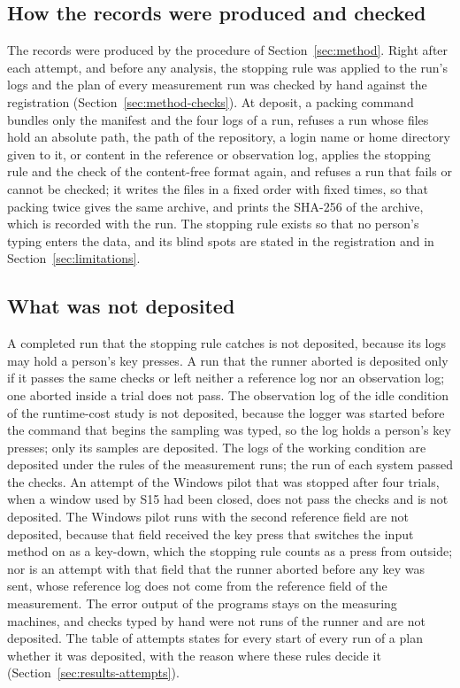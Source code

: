 \subsection{How the records were produced and checked}
\label{sec:dataset-checks}

The records were produced by the procedure of Section~\ref{sec:method}. Right after each attempt, and before any
analysis, the stopping rule was applied to the run's logs and the plan of every measurement run was checked by hand
against the registration (Section~\ref{sec:method-checks}). At deposit, a packing command bundles only the manifest and
the four logs of a run, refuses a run whose files hold an absolute path, the path of the repository, a login name or home
directory given to it, or content in the reference or observation log, applies the stopping rule and the check of the content-free
format again, and refuses a run that fails or cannot be checked; it writes the files in a fixed order with fixed times,
so that packing twice gives the same archive, and prints the SHA-256 of the archive, which is recorded with the run.
The stopping rule exists so that no person's typing enters the data, and its blind spots are stated in the
registration and in Section~\ref{sec:limitations}.

\subsection{What was not deposited}
\label{sec:dataset-excluded}

A completed run that the stopping rule catches is not deposited, because its logs may hold a person's key presses. A
run that the runner aborted is deposited only if it passes the same checks or left neither a reference log nor an
observation log; one aborted inside a trial does not pass. The observation log of the idle condition of the runtime-cost
study is not deposited, because the logger was started before the command that begins the sampling was typed, so the
log holds a person's key presses; only its samples are deposited. The logs of the working condition are deposited under
the rules of the measurement runs; the run of each system passed the checks. An attempt of the Windows pilot that
was stopped after four trials, when a window used by S15 had been closed, does not pass the checks and is not
deposited. The Windows pilot runs with the second reference field are not deposited, because that field received the
key press that switches the input method on as a key-down, which the stopping rule counts as a press from outside;
nor is an attempt with that field that the runner aborted before any key was sent, whose reference log does not come
from the reference field of the measurement. The error output of the programs stays on the measuring machines, and
checks typed by hand were not runs of the runner and are not deposited. The table of attempts states for every start
of every run of a plan whether it was deposited, with the reason where these rules decide it
(Section~\ref{sec:results-attempts}).


